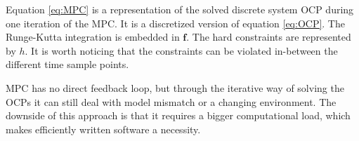 Equation \ref{eq:MPC} is a representation of the solved discrete system OCP during one iteration of the MPC. It is a discretized version of equation \ref{eq:OCP}. The Runge-Kutta integration is embedded in $\bm{f}$. The hard constraints are represented by $h$. It is worth noticing that the constraints can be violated in-between the different time sample points.\\ \cite{Panos_opti}

MPC has no direct feedback loop, but through the iterative way of solving the OCPs it can still deal with model mismatch or a changing environment. The downside of this approach is that it requires a bigger computational load, which makes efficiently written software a necessity. 


